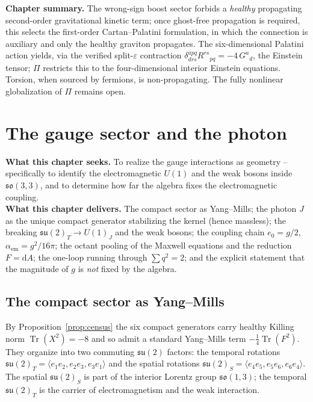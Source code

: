 \documentclass[11pt,oneside]{book}
\newcommand{\Tr}{\operatorname{Tr}}
\newcommand{\dd}{\mathrm{d}}
\newcommand{\su}{\mathfrak{su}}
\newcommand{\so}{\mathfrak{so}}
\theoremstyle{plain}
\theoremstyle{definition}
\theoremstyle{remark}
\begin{document}
\begin{leavesbox}
\textbf{Chapter summary.} The wrong-sign boost sector forbids a \emph{healthy}
propagating second-order gravitational kinetic term; once ghost-free propagation is
required, this selects the first-order Cartan--Palatini formulation, in which the
connection is auxiliary and only the healthy graviton propagates. The six-dimensional Palatini action yields, via the verified
split-$\varepsilon$ contraction $\delta^{apq}_{drs}R^{rs}{}_{pq}=-4\,G^a{}_d$, the
Einstein tensor; $\Pi$ restricts this to the four-dimensional interior Einstein
equations. Torsion, when sourced by fermions, is non-propagating. The fully
nonlinear globalization of $\Pi$ remains open.
\end{leavesbox}

\chapter{The gauge sector and the photon}
\label{ch:gauge}

\begin{leavesbox}
\textbf{What this chapter seeks.} To realize the gauge interactions as geometry --
specifically to identify the electromagnetic $U(1)$ and the weak bosons inside
$\so(3,3)$, and to determine how far the algebra fixes the electromagnetic
coupling.\\[2pt]
\textbf{What this chapter delivers.} The compact sector as Yang--Mills; the photon
$J$ as the unique compact generator stabilizing the kernel (hence massless); the
breaking $\su(2)_T\to U(1)_J$ and the weak bosons; the coupling chain
$e_0=g/2$, $\alpha_{\mathrm{em}}=g^2/16\pi$; the octant pooling of the Maxwell
equations and the reduction $F=\dd A$; the one-loop running through $\sum q^2=2$;
and the explicit statement that the magnitude of $g$ is \emph{not} fixed by the
algebra.
\end{leavesbox}

\section{The compact sector as Yang--Mills}
\label{sec:compact-ym}

By Proposition~\ref{prop:census} the six compact generators carry healthy Killing
norm $\Tr(X^2)=-8$ and so admit a standard Yang--Mills term $-\tfrac14\Tr(F^2)$.
They organize into two commuting $\su(2)$ factors: the temporal rotations
$\su(2)_T=\langle e_1e_2,e_2e_3,e_3e_1\rangle$ and the spatial rotations
$\su(2)_S=\langle e_4e_5,e_5e_6,e_6e_4\rangle$. The spatial $\su(2)_S$ is part of
the interior Lorentz group $\so(1,3)$; the temporal $\su(2)_T$ is the carrier of
electromagnetism and the weak interaction.
\end{document}
